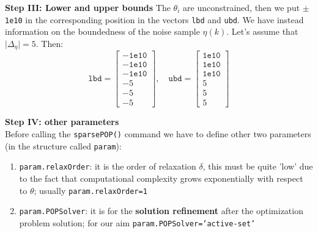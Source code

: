 \noindent
\textbf{Step III: Lower and upper bounds}
The $\theta_i$ are unconstrained, then we put \texttt{$\pm$1e10} in the corresponding position in the vectors \texttt{lbd} and \texttt{ubd}. We have instead information on the boundedness of the noise sample $\eta(k)$. Let's assume that $\vert \Delta_\eta \vert = 5$. Then:
\begin{equation*}
    \texttt{lbd} = \begin{bmatrix}
        -\texttt{1e10}\\
        -\texttt{1e10}\\
        -\texttt{1e10}\\
        -5\\
        -5\\
        -5
    \end{bmatrix}, \quad
    \texttt{ubd} = \begin{bmatrix}
        \texttt{1e10}\\
        \texttt{1e10}\\
        \texttt{1e10}\\
        5\\
        5\\
        5
    \end{bmatrix}
\end{equation*}

\noindent
\textbf{Step IV: other parameters}\\
Before calling the \texttt{sparsePOP()} command we have to define other two parameters (in the structure called \texttt{param}):
\begin{enumerate}
    \itemsep0em
    \item \texttt{param.relaxOrder}: it is the order of relaxation $\delta$, this must be quite 'low' due to the fact that computational complexity grows exponentially with respect to $\theta$; usually \texttt{param.relaxOrder=1}
    \item \texttt{param.POPSolver}: it is for the \textbf{solution refinement} after the optimization problem solution; for our aim \texttt{param.POPSolver='active-set'}
\end{enumerate}

